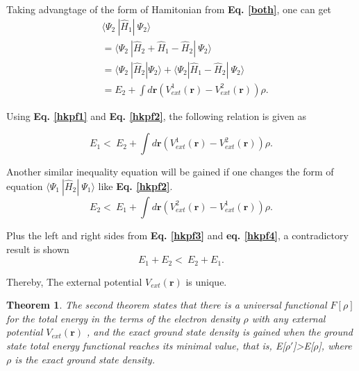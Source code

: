 \documentclass[a4paper, 12pt, titlepage,oneside,drop]{kthesis}
\newtheorem{thm}{Theorem}
\begin{document}
Taking advangtage of the form of Hamitonian from \textbf{Eq. \ref{both}}, one can get
\begin{equation}\label{hkpf2}\begin{split}
&    \langle \Psi_2\ |\hat{H}_{1}|\ \Psi_2 \rangle \\
&  = \langle \Psi_2\ |\hat{H}_{2} + \hat{H}_{1} - \hat{H}_{2}|\ \Psi_2 \rangle \\
&  = \langle \Psi_2\ |\hat{H}_{2} |\Psi_2 \rangle + \langle \Psi_2 | \hat{H}_{1} - \hat{H}_{2}|\ \Psi_2 \rangle \\
&  = E_2 + \int d \textbf{r} ( V^{1}_\textit{ext}(\textbf{r}) - V^{2}_\textit{ext}(\textbf{r}) )  \rho.
\end{split}\end{equation}

Using \textbf{Eq. \ref{hkpf1}} and \textbf{Eq. \ref{hkpf2}}, the following relation is given as

\begin{equation}\label{hkpf3}
 E_1  < \  E_2 + \int d \textbf{r} ( V^{1}_\textit{ext}(\textbf{r}) - V^{2}_\textit{ext}(\textbf{r}) )  \rho.
\end{equation}

Another similar inequality equation will be gained if one changes the form of equation $\langle \Psi_1\ |\hat{H}_{2}|\ \Psi_1 \rangle$ like \textbf{Eq. \ref{hkpf2}}.
\begin{equation}\label{hkpf4}
  E_2  < \  E_1 + \int d \textbf{r} ( V^{2}_\textit{ext}(\textbf{r}) - V^{1}_\textit{ext}(\textbf{r}) )  \rho.
\end{equation}

Plus the left and right sides from \textbf{Eq. \ref{hkpf3}} and \textbf{eq. \ref{hkpf4}}, a contradictory result is shown
\begin{equation}\label{hkpf4}
  E_1 + E_2  < \  E_2 + E_1.
\end{equation}

Thereby, The external potential $V_\textit{ext}(\textbf{r})$ is unique.

\begin{thm}
\label{hk2}
\noindent The second theorem states that there is a universal functional $F[\rho]$ for the total energy in the terms of the electron density $\rho$ with any external potential $V_\textit{ext}(\textbf{r})$ ,
and the exact ground state density is gained when the ground state total energy functional reaches its minimal value, that is, E[$\rho'$]>E[$\rho$], where $\rho$ is the exact ground state density.
\end{thm}
\end{document}
